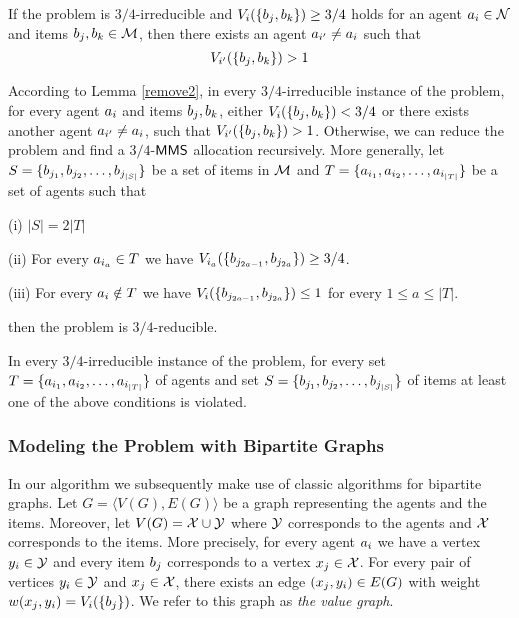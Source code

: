 \begin{lemma}
\label{remove2}
If the problem is $3/4$-irreducible and
$V_i(\{b_j,b_k\}) \geq 3/4$
holds for an agent $a_i \in \mathcal{N}$ and items $b_j, b_k \in \mathcal{M}$, then there exists an agent $a_{i'} \neq a_i$ such that
$$V_{i'}(\{b_j,b_k\}) > 1$$
\end{lemma}

According to Lemma \ref{remove2}, in every $3/4$-irreducible instance of the problem, for every agent $a_i$ and items $b_j,b_k$, either $V_i(\{b_j,b_k\}) < 3/4$ or there exists another agent $a_{i'} \neq a_i$, such that $V_{i'}(\{b_j,b_k\}) > 1$. Otherwise, we can reduce the problem and find a $3/4$-$\mathsf{MMS}$ allocation recursively. More generally, let $S = \{b_{j_1},b_{j_2},\ldots,b_{j_{|S|}}\}$ be a set of items in $\cal{M}$ and $T =\{a_{i_1},a_{i_2},\ldots,a_{i_{|T|}}\}$ be a set of agents such that
\begin{description}
 \item (i) $|S| = 2|T|$
 \item (ii) For every $a_{i_a} \in T$ we have $V_{i_a}(\{b_{j_{2a-1}},b_{j_{2a}}\}) \geq 3/4$.
 \item (iii) For every $a_{i} \notin T$ we have $V_{i}(\{b_{j_{2a-1}},b_{j_{2a}}\}) \leq 1$ for every $1 \leq a \leq |T|$.
\end{description}
then the problem is $3/4$-reducible.
\begin{lemma}\label{remove3}
In every $3/4$-irreducible instance of the problem, for every set $T =\{a_{i_1},a_{i_2},\ldots,a_{i_{|T|}}\}$ of agents and set $S = \{b_{j_1},b_{j_2},\ldots,b_{j_{|S|}}\}$ of items at least one of the above conditions is violated.
\end{lemma}

\subsubsection{Modeling the Problem with Bipartite Graphs}\label{MtPwBG}
In our algorithm we subsequently make use of classic algorithms for bipartite graphs. Let $G = \langle V(G),E(G)\rangle$ be a graph representing the agents and the items. Moreover, let $V(G) = \mathcal{X} \cup \mathcal{Y}$ where $\mathcal{Y}$ corresponds to the agents and $\mathcal{X}$ corresponds to the items. More precisely, for every agent $a_i$ we have a vertex $y_i \in \mathcal{Y}$ and every item $b_j$ corresponds to a vertex $x_j \in \mathcal{X}$. For every pair of vertices $y_i \in \mathcal{Y}$ and $x_j \in \mathcal{X}$, there exists an edge $(x_j,y_i) \in E(G)$ with weight $w(x_j,y_i) = V_i(\{b_j\})$. We refer to this graph as \emph{the value graph}.

